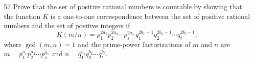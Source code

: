 \documentclass[11pt]{article}
\begin{document}
\begin{exercise}{57}
    Prove that the set of positive rational numbers is countable by
    showing that the function $K$ is a one-to-one correspondence
    between the set of positive rational numbers and the set of
    positive integers if
    \[
    K(m/n) = p_1^{2a_1} p_2^{2a_2} \cdots p_s^{2a_s}\,
    q_1^{2b_1-1} q_2^{2b_2-1} \cdots q_t^{2b_t-1},
    \]
    where $\gcd(m,n) = 1$ and the prime-power factorizations of $m$
    and $n$ are $m = p_1^{a_1} p_2^{a_2} \cdots p_s^{a_s}$ and
    $n = q_1^{b_1} q_2^{b_2} \cdots q_t^{b_t}$.
\end{exercise}
\end{document}

